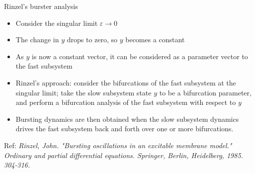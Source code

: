 \documentclass{beamer}
\begin{document}
\begin{frame}[label={sec:org3749018}]{Rinzel's burster analysis}
\begin{itemize}
\item Consider the singular limit \(\varepsilon \to 0\)
\item The change in \(y\) drops to zero, so \(y\) becomes a constant
\item As \(y\) is now a constant vector, it can be considered as a parameter vector to the fast subsystem
\item Rinzel's approach: consider the bifurcations of the fast subsystem at the singular limit; take the slow subsystem state \(y\) to be a bifurcation parameter, and perform a bifurcation analysis of the fast subsystem with respect to \(y\)
\item Bursting dynamics are then obtained when the slow subsystem dynamics drives the fast subsystem back and forth over one or more bifurcations.
\end{itemize}

Ref: \emph{Rinzel, John. "Bursting oscillations in an excitable membrane model." Ordinary and partial differential equations. Springer, Berlin, Heidelberg, 1985. 304-316.}
\end{frame}
\end{document}
